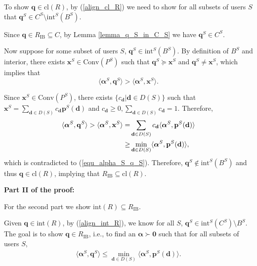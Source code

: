 \documentclass[prodmode,acmtompecs]{acmsmall}
\newcommand{\concaveHull}{R}
\begin{document}
To show $\mathbf{q} \in \text{cl}(\concaveHull)$, by (\ref{align_cl_R}) we need to show for all subsets of users $S$ that $\mathbf{q}^S \in C^S \setminus \text{int}^S(B^S)$. 

Since $\mathbf{q} \in R_{\text{IB}} \subseteq C$, by Lemma \ref{lemma_q_S_in_C_S} we have $\mathbf{q}^S \in C^S$. 

Now suppose for some subset of users $S$, $\mathbf{q}^S \in \text{int}^S(B^S)$. By definition of $B^S$ and interior, there exists $\mathbf{x}^S \in \text{Conv}(P^S)$ such that $\mathbf{q}^S \succeq \mathbf{x}^S$ and $\mathbf{q}^S \neq \mathbf{x}^S$, which implies that
$$
\langle \boldsymbol{\alpha}^S, \mathbf{q}^S \rangle > \langle \boldsymbol{\alpha}^S, \mathbf{x}^S \rangle. 
$$

\newcommand*{\cvxCombPar}{c}

Since $\mathbf{x}^S \in \text{Conv}(P^S)$, there exists $\{\cvxCombPar_\mathbf{d} | \mathbf{d}\in D(S)\}$ such that $\mathbf{x}^S = \sum\limits_{\mathbf{d} \in D(S)} \cvxCombPar_\mathbf{d} \mathbf{p}^S(\mathbf{d})$ and $\cvxCombPar_\mathbf{d} \geq 0, \sum\limits_{\mathbf{d} \in D(S)} \cvxCombPar_\mathbf{d} = 1$. Therefore, 
\begin{align}
\label{align_cvx_greater_than_min}
\langle \boldsymbol{\alpha}^S, \mathbf{q}^S \rangle > \langle \boldsymbol{\alpha}^S, \mathbf{x}^S \rangle = & \sum\limits_{\mathbf{d} \in D(S)} \cvxCombPar_\mathbf{d} \langle \boldsymbol{\alpha}^S, \mathbf{p}^S(\mathbf{d}) \rangle \notag	\\
\geq & \min\limits_{\mathbf{d} \in D(S)} \langle \boldsymbol{\alpha}^S, \mathbf{p}^S(\mathbf{d}) \rangle, 
\end{align}
which is contradicted to (\ref{equ_alpha_S_q_S}). Therefore, $\mathbf{q}^S \notin \text{int}^S(B^S)$ and thus $\mathbf{q} \in \text{cl}(\concaveHull)$, implying that $R_{\text{IB}} \subseteq \text{cl}(\concaveHull)$. 

{\bf Part II of the proof: }

For the second part we show $\text{int}(\concaveHull) \subseteq R_{\text{IB}}$.

Given $\mathbf{q} \in \text{int}(R)$, by (\ref{align_int_R}), we know for all $S$, $\mathbf{q}^S \in \text{int}^S(C^S) \setminus B^S$. The goal is to show $\mathbf{q} \in R_{\text{IB}}$, i.e., to find an $\boldsymbol{\alpha} \succ \mathbf{0}$ such that for all subsets of users $S$, 
\begin{align}
\label{align_alpha_S_q_S}
\langle \boldsymbol{\alpha}^S, \mathbf{q}^S \rangle \leq \min\limits_{\mathbf{d} \in D(S)} \langle \boldsymbol{\alpha}^S, \mathbf{p}^S(\mathbf{d}) \rangle. 
\end{align}
\end{document}
